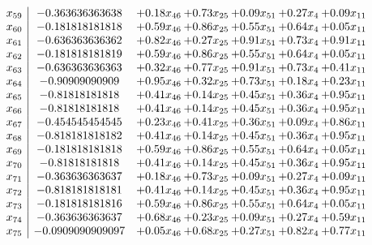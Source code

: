 \documentclass[8pt]{article}
\begin{document}
\[\begin{array}{c| c c@{\hskip 2pt} c@{\hskip 2pt} c@{\hskip 2pt} c@{\hskip 2pt} c@{\hskip 2pt} }
 x_{59}   &  -0.363636363638 & +  0.18 x_{46} & +  0.73 x_{25} & +  0.09 x_{51} & +  0.27 x_{4} & +  0.09 x_{11}\\
 x_{60}   &  -0.181818181818 & +  0.59 x_{46} & +  0.86 x_{25} & +  0.55 x_{51} & +  0.64 x_{4} & +  0.05 x_{11}\\
 x_{61}   &  -0.636363636362 & +  0.82 x_{46} & +  0.27 x_{25} & +  0.91 x_{51} & +  0.73 x_{4} & +  0.91 x_{11}\\
 x_{62}   &  -0.181818181819 & +  0.59 x_{46} & +  0.86 x_{25} & +  0.55 x_{51} & +  0.64 x_{4} & +  0.05 x_{11}\\
 x_{63}   &  -0.636363636363 & +  0.32 x_{46} & +  0.77 x_{25} & +  0.91 x_{51} & +  0.73 x_{4} & +  0.41 x_{11}\\
 x_{64}   &  -0.90909090909 & +  0.95 x_{46} & +  0.32 x_{25} & +  0.73 x_{51} & +  0.18 x_{4} & +  0.23 x_{11}\\
 x_{65}   &  -0.81818181818 & +  0.41 x_{46} & +  0.14 x_{25} & +  0.45 x_{51} & +  0.36 x_{4} & +  0.95 x_{11}\\
 x_{66}   &  -0.81818181818 & +  0.41 x_{46} & +  0.14 x_{25} & +  0.45 x_{51} & +  0.36 x_{4} & +  0.95 x_{11}\\
 x_{67}   &  -0.454545454545 & +  0.23 x_{46} & +  0.41 x_{25} & +  0.36 x_{51} & +  0.09 x_{4} & +  0.86 x_{11}\\
 x_{68}   &  -0.818181818182 & +  0.41 x_{46} & +  0.14 x_{25} & +  0.45 x_{51} & +  0.36 x_{4} & +  0.95 x_{11}\\
 x_{69}   &  -0.181818181818 & +  0.59 x_{46} & +  0.86 x_{25} & +  0.55 x_{51} & +  0.64 x_{4} & +  0.05 x_{11}\\
 x_{70}   &  -0.81818181818 & +  0.41 x_{46} & +  0.14 x_{25} & +  0.45 x_{51} & +  0.36 x_{4} & +  0.95 x_{11}\\
 x_{71}   &  -0.363636363637 & +  0.18 x_{46} & +  0.73 x_{25} & +  0.09 x_{51} & +  0.27 x_{4} & +  0.09 x_{11}\\
 x_{72}   &  -0.818181818181 & +  0.41 x_{46} & +  0.14 x_{25} & +  0.45 x_{51} & +  0.36 x_{4} & +  0.95 x_{11}\\
 x_{73}   &  -0.181818181816 & +  0.59 x_{46} & +  0.86 x_{25} & +  0.55 x_{51} & +  0.64 x_{4} & +  0.05 x_{11}\\
 x_{74}   &  -0.363636363637 & +  0.68 x_{46} & +  0.23 x_{25} & +  0.09 x_{51} & +  0.27 x_{4} & +  0.59 x_{11}\\
 x_{75}   &  -0.0909090909097 & +  0.05 x_{46} & +  0.68 x_{25} & +  0.27 x_{51} & +  0.82 x_{4} & +  0.77 x_{11}\\

\end{array}\]
\end{document}
